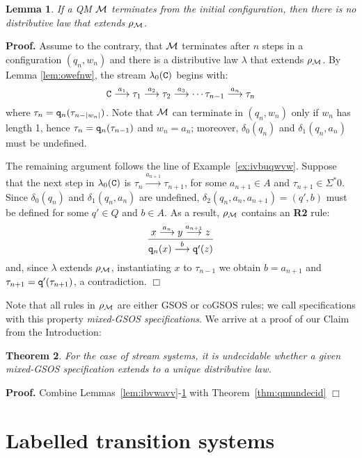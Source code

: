 \documentclass[adraft,copyright,creativecommons]{eptcs}
\newtheorem{theorem}{Theorem}
\newtheorem{lemma}[theorem]{Lemma}
\newenvironment{proof}[1][Proof]{\noindent\textbf{#1.} }{{\hfill $\Box$ \\}}
\newcommand{\Ss}{\Sigma^*}
\newcommand{\goes}[1]{\stackrel{#1}{\longrightarrow}}
\begin{document}
\begin{lemma}\label{lem:wbvvw}\rm
If a QM ${\cal M}$ terminates from the initial configuration, then there is no distributive law that extends $\rho_{\cal M}$.
\end{lemma}
\begin{proof}
Assume to the contrary, that $\cal M$ terminates after $n$ steps in a configuration $(q_n,w_n)$ and there is a distributive law $\lambda$ that extends $\rho_{\cal M}$. By Lemma \ref{lem:owefnw}, the stream $\lambda_0({\tt C})$ begins with:
\[
{\tt C} \goes{a_1}\tau_1\goes{a_2}\tau_2\goes{a_3}\cdots\tau_{n-1}\goes{a_n}\tau_n
\] 
where $\tau_n={\tt q}_n(\tau_{n-|w_n|})$. Note that $\cal M$ can terminate in $(q_n,w_n)$ only if $w_n$ has length 1, hence $\tau_n={\tt q}_n(\tau_{n-1})$ and $w_n=a_n$; moreover, $\delta_0(q_n)$ and $\delta_1(q_n,a_n)$ must be undefined.

The remaining argument follows the line of Example~\ref{ex:ivbuqwvw}. Suppose that the next step in $\lambda_0({\tt C})$ is $\tau_n\goes{a_{n+1}}\tau_{n+1}$, for some $a_{n+1}\in A$ and $\tau_{n+1}\in\Ss 0$. Since $\delta_0(q_n)$ and $\delta_1(q_n,a_n)$ are undefined, $\delta_2(q_n,a_n,a_{n+1})=(q',b)$ must be defined for some $q'\in Q$ and $b\in A$. As a result, $\rho_{\cal M}$ contains an {\bf R2} rule:
\[
\dfrac{x\goes{a_n}y\goes{a_{n+1}}z} {{\tt q}_n(x)\goes{b}{\tt q'}(z)}
\]
and, since $\lambda$ extends $\rho_{\cal M}$, instantiating $x$ to $\tau_{n-1}$ we obtain $b=a_{n+1}$ and $\tau_{n+1}={\tt q'}(\tau_{n+1})$, a contradiction.
\end{proof}

Note that all rules in $\rho_{\cal M}$ are either GSOS or coGSOS rules; we call specifications with this property {\em mixed-GSOS specifications}. We arrive at a proof of our Claim from the Introduction:

\begin{theorem}\label{thm:ssundec}\rm
For the case of stream systems,
it is undecidable whether a given mixed-GSOS specification extends to a unique distributive law.
\end{theorem}
\begin{proof}
Combine Lemmas~\ref{lem:ibvwavv}-\ref{lem:wbvvw} with Theorem~\ref{thm:qmundecid}
\end{proof}

\section{Labelled transition systems}\label{sec:qm2lts}
\end{document}
